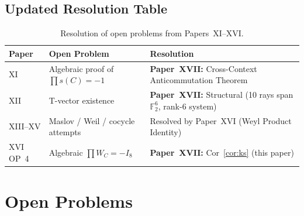 \documentclass[11pt,a4paper]{article}
\theoremstyle{remark}
\begin{document}
\subsection{Updated Resolution Table}

\begin{table}[H]
\centering
\caption{Resolution of open problems from Papers~XI--XVI.}
\label{tab:resolution}
\begin{tabular}{p{1.4cm}p{5.0cm}p{5.4cm}}
\toprule
Paper & Open Problem & Resolution \\
\midrule
XI & Algebraic proof of $\prod s(C) = -1$
   & \textbf{Paper~XVII:} Cross-Context Anticommutation Theorem \\
\addlinespace
XII & T-vector existence
   & \textbf{Paper~XVII:} Structural (10 rays span $\mathbb{F}_2^6$,
     rank-6 system) \\
\addlinespace
XIII--XV & Maslov / Weil / cocycle attempts
   & Resolved by Paper~XVI (Weyl Product Identity) \\
\addlinespace
XVI OP~4 & Algebraic $\prod W_C = -I_8$
   & \textbf{Paper~XVII:} Cor~\ref{cor:ks} (this paper) \\
\bottomrule
\end{tabular}
\end{table}


\section{Open Problems}\label{sec:open}
\end{document}
